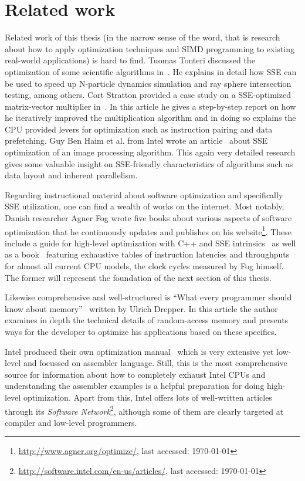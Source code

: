 \section{Related work}
\label{Related_work}

Related work of this thesis (in the narrow sense of the word, that is research about how to apply optimization techniques and SIMD programming to existing real-world applications) is hard to find. Tuomas Tonteri discussed the optimization of some scientific algorithms in~\cite{tonteri2012}. He explains in detail how SSE can be used to speed up N-particle dynamics simulation and ray sphere intersection testing, among others. Cort Stratton provided a case study on a SSE-optimized matrix-vector multiplier in~\cite{stratton2002}. In this article he gives a step-by-step report on how he iteratively improved the multiplication algorithm and in doing so explains the CPU provided levers for optimization such as instruction pairing and data prefetching. Guy Ben Haim et al. from Intel wrote an article~\cite{haim2009} about SSE optimization of an image processing algorithm. This again very detailed research gives some valuable insight on SSE-friendly characteristics of algorithms such as data layout and inherent parallelism.

Regarding instructional material about software optimization and specifically SSE utilization, one can find a wealth of works on the internet. Most notably, Danish researcher Agner Fog wrote five books about various aspects of software optimization that he continuously updates and publishes on his website\footnote{\url{http://www.agner.org/optimize/}, last accessed: \today{}}. These include a guide for high-level optimization with C++ and SSE intrinsics~\cite{fog2011optimizing} as well as a book~\cite{fog2011instructiontables} featuring exhaustive tables of instruction latencies and throughputs for almost all current CPU models, the clock cycles measured by Fog himself. The former will represent the foundation of the next section of this thesis.

Likewise comprehensive and well-structured is ``What every programmer should know about memory''~\cite{drepper2007memory} written by Ulrich Drepper. In this article the author examines ín depth the technical details of random-access memory and presents ways for the developer to optimize his applications based on these specifics.

Intel produced their own optimization manual~\cite{intel2011manual} which is very extensive yet low-level and focussed on assembler language. Still, this is the most comprehensive source for information about how to completely exhaust Intel CPUs and understanding the assembler examples is a helpful preparation for doing high-level optimization. Apart from this, Intel offers lots of well-written articles through its \emph{Software Network}\footnote{\url{http://software.intel.com/en-us/articles/}, last accessed: \today{}}, although some of them are clearly targeted at compiler and low-level programmers.

